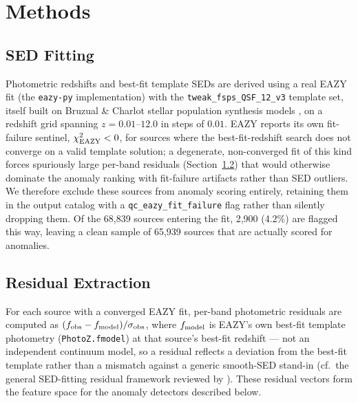 \documentclass[twocolumn]{aastex631}
\begin{document}
\section{Methods}
\label{sec:methods}

\subsection{SED Fitting}
\label{sec:sed-fitting}

Photometric redshifts and best-fit template SEDs are derived using a real
EAZY fit \citep{Brammer2008} (the \texttt{eazy-py} implementation) with the
\texttt{tweak\_fsps\_QSF\_12\_v3} template set, itself built on Bruzual \&
Charlot stellar population synthesis models \citep{BruzualCharlot2003}, on
a redshift grid spanning $z=0.01$--$12.0$ in steps of $0.01$. EAZY reports
its own fit-failure sentinel, $\chi^2_{\rm EAZY} < 0$, for sources where
the best-fit-redshift search does not converge on a valid template
solution; a degenerate, non-converged fit of this kind forces spuriously
large per-band residuals (Section~\ref{sec:residual-extraction}) that would
otherwise dominate the anomaly ranking with fit-failure artifacts rather
than SED outliers. We therefore exclude these sources from anomaly
scoring entirely, retaining them in the output catalog with a
\texttt{qc\_eazy\_fit\_failure} flag rather than silently dropping them.
Of the 68,839 sources entering the fit, 2,900 (4.2\%) are flagged this way,
leaving a clean sample of 65,939 sources that are actually scored for
anomalies.

\subsection{Residual Extraction}
\label{sec:residual-extraction}

For each source with a converged EAZY fit, per-band photometric residuals
are computed as $(f_{\rm obs} - f_{\rm model}) / \sigma_{\rm obs}$, where
$f_{\rm model}$ is EAZY's own best-fit template photometry
(\texttt{PhotoZ.fmodel}) at that source's best-fit redshift --- not an
independent continuum model, so a residual reflects a deviation
from the best-fit template rather than a mismatch against a generic
smooth-SED stand-in (cf.\ the general SED-fitting residual framework
reviewed by \citealt{Conroy2013}). These residual vectors form the feature
space for the anomaly detectors described below.
\end{document}
